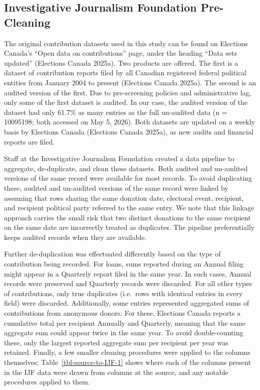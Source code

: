 \documentclass[
  letterpaper,
  DIV=11,
  numbers=noendperiod]{scrartcl}
\begin{document}
\subsection{Investigative Journalism Foundation
Pre-Cleaning}\label{sec-source-to-IJF}

The original contribution datasets used in this study can be found on
Elections Canada's ``Open data on contributions'' page, under the
heading ``Data sets updated'' (Elections Canada 2025a). Two products are
offered. The first is a dataset of contribution reports filed by all
Canadian registered federal political entities from January 2004 to
present (Elections Canada 2025a). The second is an audited version of
the first. Due to pre-screening policies and administrative lag, only
some of the first dataset is audited. In our case, the audited version
of the dataset had only 61.7\% as many entries as the full un-audited
data (n = 10095198; both accessed on May 5, 2026). Both datasets are
updated on a weekly basis by Elections Canada (Elections Canada 2025a),
as new audits and financial reports are filed.

Staff at the Investigative Journalism Foundation created a data pipeline
to aggregate, de-duplicate, and clean these datasets. Both audited and
un-audited versions of the same record were available for most records.
To avoid duplicating these, audited and un-audited versions of the same
record were linked by assuming that rows sharing the same donation date,
electoral event, recipient, and recipient political party referred to
the same entry. We note that this linkage approach carries the small
risk that two distinct donations to the same recipient on the same date
are incorrectly treated as duplicates. The pipeline preferentially keeps
audited records when they are available.

Further de-duplication was effectuated differently based on the type of
contribution being recorded. For loans, sums reported during an Annual
filing might appear in a Quarterly report filed in the same year. In
such cases, Annual records were preserved and Quarterly records were
discarded. For all other types of contributions, only true duplicates
(i.e.~rows with identical entries in every field) were discarded.
Additionally, some entries represented aggregated sums of contributions
from anonymous donors. For these, Elections Canada reports a cumulative
total per recipient Annually and Quarterly, meaning that the same
aggregate sum could appear twice in the same year. To avoid
double-counting these, only the largest reported aggregate sum per
recipient per year was retained. Finally, a few smaller cleaning
procedures were applied to the columns themselves;
Table~\ref{tbl-source-to-IJF-1} shows where each of the columns present
in the IJF data were drawn from columns at the source, and any notable
procedures applied to them.
\end{document}
